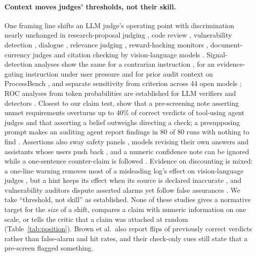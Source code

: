 \documentclass[letterpaper]{article} %
\begin{document}
\paragraph{Context moves judges' thresholds, not their skill.} One framing line shifts an LLM judge's operating point with discrimination nearly unchanged in research-proposal judging \citep{ho2026soundnessbench}, code review \citep{alexopoulos2026agrees}, vulnerability detection \citep{shahriar2026words}, dialogue \citep{rabbani2026dialdefer}, relevance judging \citep{zhang2026polite}, reward-hacking monitors \citep{kezendirane2026hacking}, document-currency judges \citep{shah2026verify} and citation checking by vision-language models \citep{abtahi2026sanad}. Signal-detection analyses show the same for a contrarian instruction \citep{quiroz2026criterion}, for an evidence-gating instruction under user pressure \citep{basta2026correction} and for prior audit context on ProcessBench \citep{mazaheri2026prior}, and separate sensitivity from criterion across 44 open models \citep{dong2026sensitivity}; ROC analyses from token probabilities are established for LLM verifiers and detectors \citep{anon2026zebra,cacioli2026signal,chegini2025razor}. Closest to our claim test, \citet{brown2026grounded} show that a pre-screening note asserting unmet requirements overturns up to 40\% of correct verdicts of tool-using agent judges and that asserting a belief outweighs directing a check; a presupposing prompt makes an auditing agent report findings in 80 of 80 runs with nothing to find \citep{shah2026auditing}. Assertions also sway safety panels \citep{hu2026social}, models revising their own answers \citep{hu2026conformity,huang2026anatomy} and assistants whose users push back \citep{sharma2024sycophancy,laban2023flipflop}, and a numeric confidence note can be ignored while a one-sentence counter-claim is followed \citep{anon2026confidenceblind}. Evidence on discounting is mixed: a one-line warning removes most of a misleading log's effect on vision-language judges \citep{zhao2026logs}, but a hint keeps its effect when its source is declared inaccurate \citep{guo2026dog}, and vulnerability auditors dispute asserted alarms yet follow false assurances \citep{liu2026trusting}. We take ``threshold, not skill'' as established. None of these studies gives a normative target for the \emph{size} of a shift, compares a claim with numeric information on one scale, or tells the critic that a claim was attached at random (Table~\ref{tab:position}). Brown et al.\ also report flips of previously correct verdicts rather than false-alarm and hit rates, and their check-only cues still state that a pre-screen flagged something.
\end{document}

